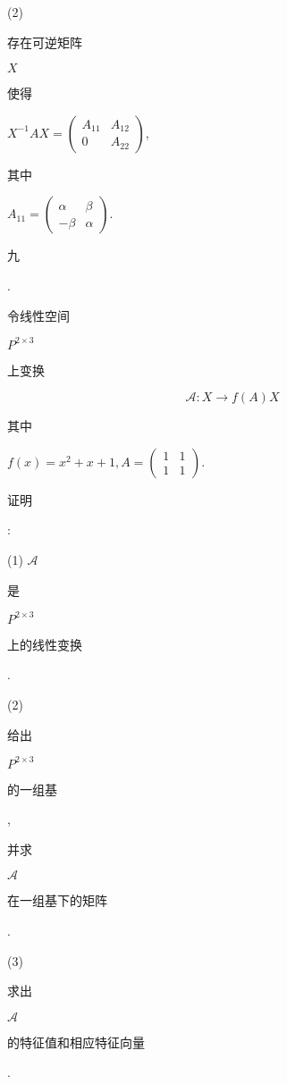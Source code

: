 \documentclass[10pt]{article}
\begin{document}
(2) \begin{CJK}{UTF8}{mj}存在可逆矩阵\end{CJK} $X$ \begin{CJK}{UTF8}{mj}使得\end{CJK} $X^{-1} A X=\left(\begin{array}{cc}A_{11} & A_{12} \\ 0 & A_{22}\end{array}\right)$, \begin{CJK}{UTF8}{mj}其中\end{CJK} $A_{11}=\left(\begin{array}{cc}\alpha & \beta \\ -\beta & \alpha\end{array}\right)$. \begin{CJK}{UTF8}{mj}九\end{CJK}. \begin{CJK}{UTF8}{mj}令线性空间\end{CJK} $P^{2 \times 3}$ \begin{CJK}{UTF8}{mj}上变换\end{CJK}
$$
\mathscr{A}: X \rightarrow f(A) X
$$
\begin{CJK}{UTF8}{mj}其中\end{CJK} $f(x)=x^{2}+x+1, A=\left(\begin{array}{ll}1 & 1 \\ 1 & 1\end{array}\right)$. \begin{CJK}{UTF8}{mj}证明\end{CJK}:

(1) $\mathscr{A}$ \begin{CJK}{UTF8}{mj}是\end{CJK} $P^{2 \times 3}$ \begin{CJK}{UTF8}{mj}上的线性变换\end{CJK}.

(2) \begin{CJK}{UTF8}{mj}给出\end{CJK} $P^{2 \times 3}$ \begin{CJK}{UTF8}{mj}的一组基\end{CJK}, \begin{CJK}{UTF8}{mj}并求\end{CJK} $\mathscr{A}$ \begin{CJK}{UTF8}{mj}在一组基下的矩阵\end{CJK}.

(3) \begin{CJK}{UTF8}{mj}求出\end{CJK} $\mathscr{A}$ \begin{CJK}{UTF8}{mj}的特征值和相应特征向量\end{CJK}.
\end{document}
